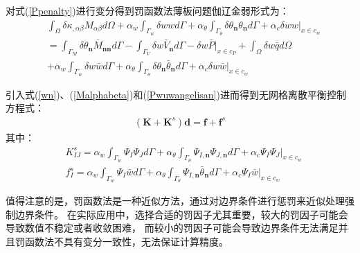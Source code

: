 对式(\ref{Ppenalty})进行变分得到罚函数法薄板问题伽辽金弱形式为：
\begin{equation}
\begin{split}
    &\int_{\Omega}\delta\kappa_{,\alpha\beta}M_{\alpha\beta}d\Omega
    +\alpha_w\int_{\Gamma_w}\delta wwd\Gamma+\alpha_{\theta}\int_{\Gamma_{\theta}}\delta\theta_{\pmb{n}}\theta_{\pmb{n}}d\Gamma+\alpha_c\delta ww\vert_{x\in c_w}\\
    &=\int_{\Gamma_M}\delta\theta_{\pmb{n}}\bar{M}_{\pmb{nn}}d\Gamma-\int_{\Gamma_V}\delta w\bar{V}_{\pmb{n}}d\Gamma-\delta w\bar{P}\vert_{x\in c_P}+\int_{\Omega}\delta w\bar{q}d\Omega\\
    &+\alpha_w\int_{\Gamma_w}\delta w\bar{w}d\Gamma+\alpha_{\theta}\int_{\Gamma_{\theta}}\delta\theta_{\pmb{n}}\bar{\theta}_{\pmb{n}}d\Gamma+\alpha_c\delta w\bar{w}\vert_{x\in c_w}
\end{split}
\end{equation}\par
引入式(\ref{wn})、(\ref{Malphabeta})和(\ref{Pwuwangelisan})进而得到无网格离散平衡控制方程式：
\begin{equation}
\begin{split}
    (\pmb{K}+\pmb{K}^s)\pmb{d}=\pmb{f}+\pmb{f}^s
\end{split}
\end{equation}
其中：
\begin{subequations}
\begin{align}
   &K^s_{IJ}=\alpha_w\int_{\Gamma_w}\Psi_I\Psi_Jd\Gamma+\alpha_{\theta}\int_{\Gamma_{\theta}}\Psi_{I,\pmb n}\Psi_{J,\pmb n}d\Gamma+\alpha_c\Psi_I\Psi_J\vert_{x\in c_w}\\
&f^s_I=\alpha_w\int_{\Gamma_w}\Psi_I\bar{w}d\Gamma+\alpha_{\theta}\int_{\Gamma_{\theta}}\Psi_{I,\pmb n}\bar{\theta}_{\pmb n}d\Gamma+\alpha_c\Psi_I\bar{w}\vert_{x\in c_w}
\end{align}
\end{subequations}\par
值得注意的是，罚函数法是一种近似方法，通过对边界条件进行惩罚来近似处理强制边界条件。
在实际应用中，选择合适的罚因子尤其重要，较大的罚因子可能会导致数值不稳定或者收敛困难，
而较小的罚因子可能会导致边界条件无法满足并且罚函数法不具有变分一致性，无法保证计算精度。
